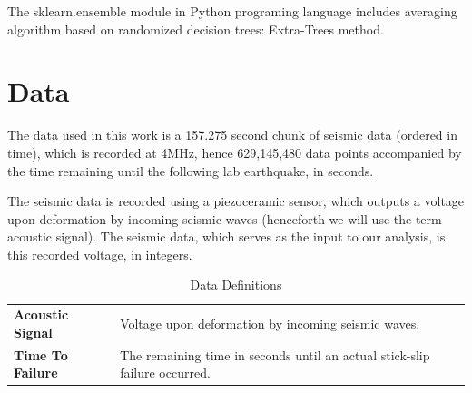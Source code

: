 \documentclass[]{llncs} %
\begin{document}
The sklearn.ensemble module in Python programing language includes averaging algorithm based on randomized decision trees: Extra-Trees method. \par

\section{Data} 
The data used in this work is a  157.275 second chunk of seismic data (ordered in time), which is recorded at 4MHz, hence 629,145,480 data points accompanied by the time remaining until the following lab earthquake, in seconds. \par
The seismic data is recorded using a piezoceramic sensor, which outputs a voltage upon deformation by incoming seismic waves (henceforth we will use the term acoustic signal). The seismic data, which serves as the input to our analysis, is this recorded voltage, in integers. \par
\begin{table}
	\begin{center}
		\caption{Data Definitions}
		\label{tab:DataDefinitions}
		\begin{tabular}{ll}
			\textbf{Acoustic Signal} & Voltage upon deformation by incoming seismic waves. \\
			\textbf{Time To Failure} & The remaining time in seconds until an actual stick-slip failure occurred.  \\
		\end{tabular}
	\end{center}
\end{table}
\end{document}
